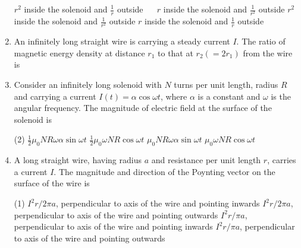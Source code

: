 \begin{enumerate}
\begin{tasks}
		\task[\textbf{A.}] $r^{2}$ inside the solenoid and $\frac{1}{r}$ outside $\quad$  
		\task[\textbf{B.}]$r$ inside the solenoid and $\frac{1}{r^{2}}$ outside
		\task[\textbf{C.}] $r^{2}$ inside the solenoid and $\frac{1}{r^{2}}$ outside
		\task[\textbf{D.}]$r$ inside the solenoid and $\frac{1}{r}$ outside
	\end{tasks}
	\item An infinitely long straight wire is carrying a steady current $I$. The ratio of magnetic energy density at distance $r_{1}$ to that at $r_{2}\left(=2 r_{1}\right)$ from the wire is
	{	}
	\item Consider an infinitely long solenoid with $N$ turns per unit length, radius $R$ and carrying a current $I(t)=\alpha \cos \omega t$, where $\alpha$ is a constant and $\omega$ is the angular frequency. The magnitude of electric field at the surface of the solenoid is
	{	}
	\begin{tasks}(2)
		\task[\textbf{A.}] $\frac{1}{2} \mu_{0} N R \omega \alpha \sin \omega t$
		\task[\textbf{B.}]$\frac{1}{2} \mu_{0} \omega N R \cos \omega t$
		\task[\textbf{C.}]$\mu_{0} N R \omega \alpha \sin \omega t$
		\task[\textbf{D.}]$\mu_{0} \omega N R \cos \omega t$
	\end{tasks}
	
	\item A long straight wire, having radius $a$ and resistance per unit length $r$, carries a current $I$. The magnitude and direction of the Poynting vector on the surface of the wire is
	{}
	
	\begin{tasks}(1)
		\task[\textbf{A.}] $I^{2} r / 2 \pi a$, perpendicular to axis of the wire and pointing inwards
		\task[\textbf{B.}]$I^{2} r / 2 \pi a$, perpendicular to axis of the wire and pointing outwards
		\task[\textbf{C.}]$I^{2} r / \pi a$, perpendicular to axis of the wire and pointing inwards
		\task[\textbf{D.}]$I^{2} r / \pi a$, perpendicular to axis of the wire and pointing outwards
	\end{tasks}
\end{enumerate}



